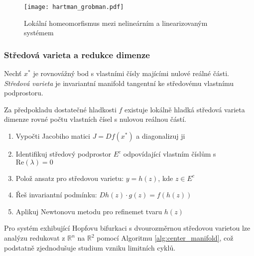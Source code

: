 \begin{figure}[H]
\centering
\texttt{[image: hartman\_grobman.pdf]}
\caption{Lokální homeomorfismus mezi nelineárním a linearizovaným systémem}
\label{fig:hartman_grobman}
\end{figure}

\subsubsection{Středová varieta a redukce dimenze}

\begin{definition}
Nechť $x^*$ je rovnovážný bod s vlastními čísly majícími nulové reálné části. \emph{Středová varieta} je invariantní manifold tangentní ke středovému vlastnímu podprostoru.
\end{definition}

\begin{theorem}
Za předpokladu dostatečné hladkosti $f$ existuje lokálně hladká středová varieta dimenze rovné počtu vlastních čísel s nulovou reálnou částí.
\end{theorem}

\begin{algorithm}
\label{alg:center_manifold}
\begin{enumerate}
\item Vypočti Jacobiho matici $J = Df(x^*)$ a diagonalizuj ji
\item Identifikuj středový podprostor $E^c$ odpovídající vlastním číslům s $\mathrm{Re}(\lambda) = 0$
\item Polož ansatz pro středovou varietu: $y = h(z)$, kde $z \in E^c$
\item Řeš invariantní podmínku: $Dh(z) \cdot g(z) = f(h(z))$
\item Aplikuj Newtonovu metodu pro refinemet tvaru $h(z)$
\end{enumerate}
\end{algorithm}

\begin{application}
Pro systém exhibující Hopfovu bifurkaci s dvourozměrnou středovou varietou lze analýzu redukovat z $\mathbb{R}^n$ na $\mathbb{R}^2$ pomocí Algoritmu \ref{alg:center_manifold}, což podstatně zjednodušuje studium vzniku limitních cyklů.
\end{application}

\spc

